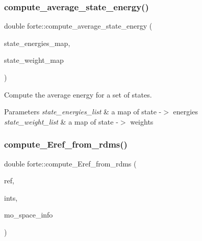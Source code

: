 \mbox{\label{namespaceforte_a0d65a13f4c1bf6fdbd3a78dd92268c75}} 
\subsubsection{\texorpdfstring{compute\+\_\+average\+\_\+state\+\_\+energy()}{compute\_average\_state\_energy()}}
{\footnotesize\ttfamily double forte\+::compute\+\_\+average\+\_\+state\+\_\+energy (\begin{DoxyParamCaption}\item[{const std\+::map$<$ \mbox{\hyperlink{classforte_1_1_state_info}{State\+Info}}, std\+::vector$<$ double $>$$>$ \&}]{state\+\_\+energies\+\_\+map,  }\item[{const std\+::map$<$ \mbox{\hyperlink{classforte_1_1_state_info}{State\+Info}}, std\+::vector$<$ double $>$$>$ \&}]{state\+\_\+weight\+\_\+map }\end{DoxyParamCaption})}



Compute the average energy for a set of states. 


\begin{DoxyParams}{Parameters}
{\em state\+\_\+energies\+\_\+list} & a map of state -\/$>$ energies \\
\hline
{\em state\+\_\+weight\+\_\+list} & a map of state -\/$>$ weights \\
\hline
\end{DoxyParams}
\mbox{\label{namespaceforte_aff4e1844004f1660d16175bf399d1c33}} 
\subsubsection{\texorpdfstring{compute\+\_\+\+Eref\+\_\+from\+\_\+rdms()}{compute\_Eref\_from\_rdms()}}
{\footnotesize\ttfamily double forte\+::compute\+\_\+\+Eref\+\_\+from\+\_\+rdms (\begin{DoxyParamCaption}\item[{\mbox{\hyperlink{classforte_1_1_r_d_ms}{R\+D\+Ms}} \&}]{ref,  }\item[{std\+::shared\+\_\+ptr$<$ \mbox{\hyperlink{classforte_1_1_forte_integrals}{Forte\+Integrals}} $>$}]{ints,  }\item[{std\+::shared\+\_\+ptr$<$ \mbox{\hyperlink{classforte_1_1_m_o_space_info}{M\+O\+Space\+Info}} $>$}]{mo\+\_\+space\+\_\+info }\end{DoxyParamCaption})}



